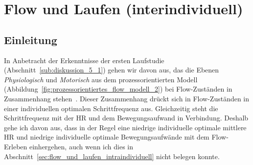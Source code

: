 

\section{Flow und Laufen (interindividuell)} 

\label{sec:flow_und_laufen_interindividuell}

\subsection{Einleitung} 

\label{sub:einleitung_5_3}

In Anbetracht der Erkenntnisse der ersten Laufstudie (Abschnitt~\ref{sub:diskussion_5_1}) gehen wir davon aus, das die Ebenen \emph{Physiologisch} und \emph{Motorisch} aus dem prozessorientierten Modell (Abbildung~\ref{fig:prozessorientiertes_flow_modell_2}) bei Flow-Zuständen in Zusammenhang stehen~\citep{Grueter2016a}. Dieser Zusammenhang drückt sich in Flow-Zuständen in einer individuellen optimalen Schrittfrequenz aus. Gleichzeitig steht die Schrittfrequenz mit der \ac{HR} und dem Bewegungsaufwand in Verbindung. Deshalb gehe ich davon aus, dass in der Regel eine niedrige individuelle optimale mittlere \ac{HR} und niedrige individuelle optimale Bewegungsaufwände mit dem Flow-Erleben einhergehen, auch wenn ich dies in Abschnitt~\ref{sec:flow_und_laufen_intraindividuell} nicht belegen konnte. 

